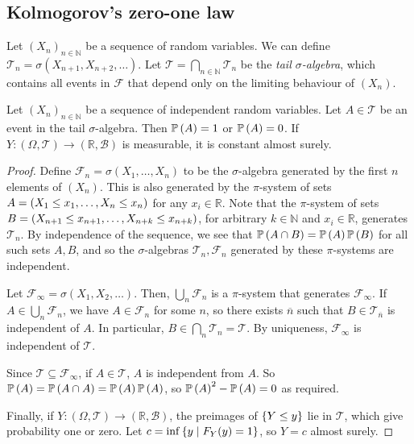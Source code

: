 \subsection{Kolmogorov's zero-one law}
Let \( (X_n)_{n \in \mathbb N} \) be a sequence of random variables.
We can define \( \mathcal T_n = \sigma(X_{n+1}, X_{n+2}, \dots) \).
Let \( \mathcal T = \bigcap_{n \in \mathbb N} \mathcal T_n \) be the \emph{tail \( \sigma \)-algebra}, which contains all events in \( \mathcal F \) that depend only on the limiting behaviour of \( (X_n) \).
\begin{theorem}
	Let \( (X_n)_{n \in \mathbb N} \) be a sequence of independent random variables.
	Let \( A \in \mathcal T \) be an event in the tail \( \sigma \)-algebra.
	Then \( \mathbb{P}\left({A}\right) = 1 \) or \( \mathbb{P}\left({A}\right) = 0 \).
	If \( Y \colon (\Omega,\mathcal T) \to (\mathbb R,\mathcal B) \) is measurable, it is constant almost surely.
\end{theorem}
\begin{proof}
	Define \( \mathcal F_n = \sigma(X_1, \dots, X_n) \) to be the \( \sigma \)-algebra generated by the first \( n \) elements of \( (X_n) \).
	This is also generated by the \( \pi \)-system of sets \( A = \qty(X_1 \leq x_1, \dots, X_n \leq x_n) \) for any \( x_i \in \mathbb R \).
	Note that the \( \pi \)-system of sets \( B = \qty(X_{n+1} \leq x_{n+1}, \dots, X_{n+k} \leq x_{n+k}) \), for arbitrary \( k \in \mathbb N \) and \( x_i \in \mathbb R \), generates \( \mathcal T_n \).
	By independence of the sequence, we see that \( \mathbb{P}\left({A \cap B}\right) = \mathbb{P}\left({A}\right) \mathbb{P}\left({B}\right) \) for all such sets \( A, B \), and so the \( \sigma \)-algebras \( \mathcal T_n, \mathcal F_n \) generated by these \( \pi \)-systems are independent.

	Let \( \mathcal F_\infty = \sigma(X_1, X_2, \dots) \).
	Then, \( \bigcup_n \mathcal F_n \) is a \( \pi \)-system that generates \( \mathcal F_\infty \).
	If \( A \in \bigcup_n \mathcal F_n \), we have \( A \in \mathcal F_n \) for some \( n \), so there exists \( \overline n \) such that \( B \in \mathcal T_{\overline n} \) is independent of \( A \).
	In particular, \( B \in \bigcap_n \mathcal T_n = \mathcal T \).
	By uniqueness, \( \mathcal F_\infty \) is independent of \( \mathcal T \).

	Since \( \mathcal T \subseteq \mathcal F_\infty \), if \( A \in \mathcal T \), \( A \) is independent from \( A \).
	So \( \mathbb{P}\left({A}\right) = \mathbb{P}\left({A \cap A}\right) = \mathbb{P}\left({A}\right)\mathbb{P}\left({A}\right) \), so \( \mathbb{P}\left({A}\right)^2 - \mathbb{P}\left({A}\right) = 0 \) as required.

	Finally, if \( Y \colon (\Omega,\mathcal T) \to (\mathbb R,\mathcal B) \), the preimages of \( \qty{Y \leq y} \) lie in \( \mathcal T \), which give probability one or zero.
	Let \( c = \inf\qty{y \mid F_Y(y) = 1} \), so \( Y = c \) almost surely.
\end{proof}
